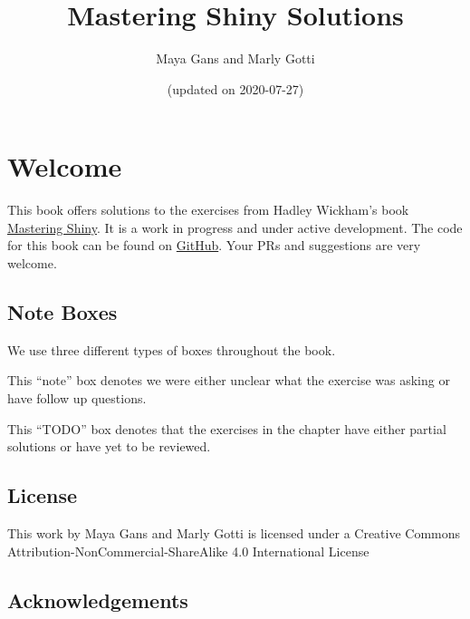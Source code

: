 \documentclass[]{book}
\title{Mastering Shiny Solutions}
\author{Maya Gans and Marly Gotti}
\date{(updated on 2020-07-27)}
\begin{document}
\maketitle

{
\setcounter{tocdepth}{1}
\tableofcontents
}
\hypertarget{welcome}{%
\chapter*{Welcome}\label{welcome}}

This book offers solutions to the exercises from Hadley Wickham's book \href{https://mastering-shiny.org/}{Mastering Shiny}. It is a work in progress and under active development. The code for this book can be found on \href{https://github.com/marlycormar/mastering_shiny_book_solutions}{GitHub}. Your PRs and suggestions are very welcome.

\hypertarget{note-boxes}{%
\section*{Note Boxes}\label{note-boxes}}

We use three different types of boxes throughout the book.

\begin{note}

This ``note'' box denotes we were either unclear what the exercise was asking or have follow up questions.

\end{note}

\begin{TODO}

This ``TODO'' box denotes that the exercises in the chapter have either partial solutions or have yet to be reviewed.

\end{TODO}

\hypertarget{license}{%
\section*{License}\label{license}}

This work by Maya Gans and Marly Gotti is licensed under a Creative Commons Attribution-NonCommercial-ShareAlike 4.0 International License

\hypertarget{acknowledgements}{%
\section*{Acknowledgements}\label{acknowledgements}}
\end{document}
